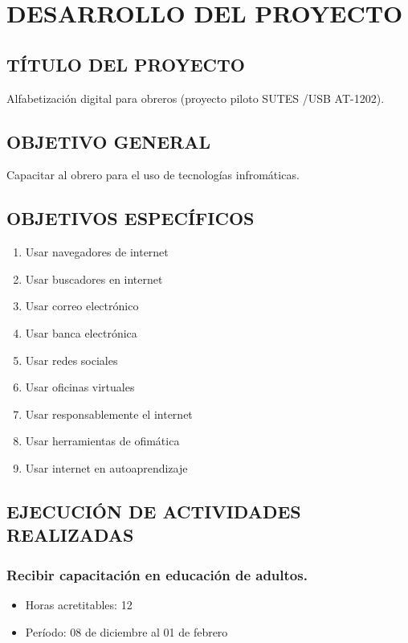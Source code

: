 	\chapter{DESARROLLO DEL PROYECTO}

        \section{TÍTULO DEL PROYECTO}
            Alfabetización digital para obreros (proyecto piloto SUTES /USB AT-1202).
            
        \section{OBJETIVO GENERAL}
            Capacitar al obrero para el uso de tecnologías infromáticas.
            
        \section{OBJETIVOS ESPECÍFICOS}
            \begin{enumerate}
                \item Usar navegadores de internet
                \item Usar buscadores en internet
                \item Usar correo electrónico
                \item Usar banca electrónica
                \item Usar redes sociales
                \item Usar oficinas virtuales
                \item Usar responsablemente el internet
                \item Usar herramientas de ofimática
                \item Usar internet en autoaprendizaje
            \end{enumerate}
            
        \section{EJECUCIÓN DE ACTIVIDADES REALIZADAS}

             \subsection {Recibir capacitación en educación de adultos.}
             \begin{itemize}
                 \item Horas acretitables: 12
                 \item Período: 08 de diciembre al 01 de febrero
                \end{itemize}
             
